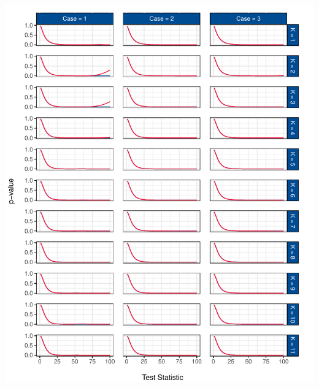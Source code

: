 \documentclass[12pt,a4paper]{article}
\let\origfigure\figure
\let\endorigfigure\endfigure
\renewenvironment{figure}[1][2] {
    \expandafter\origfigure\expandafter[H]
} {
    \endorigfigure
}
\begin{document}
\begin{figure}
\centering
\includegraphics{p_approx_paper_files/figure-latex/p_stat_all-1.pdf}
\caption{\label{fig:fig_3} Corrected (blue) and uncorrected (red)
\(p\)-value predictions for all cases and all underlying tests.}
\end{figure}
\end{document}
